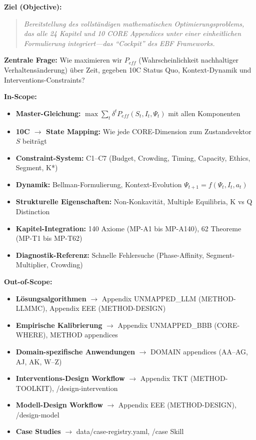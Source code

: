 \begin{tcolorbox}[colback=orange!5!white, colframe=orange!75!black,
    title=\textbf{Appendix Scope: Ziel / In-Scope / Out-of-Scope / Lieferobjekte}]

\textbf{Ziel (Objective):}
\begin{quote}
\textit{Bereitstellung des vollständigen mathematischen Optimierungsproblems, das alle 24 Kapitel
und 10 CORE Appendices unter einer einheitlichen Formulierung integriert---das ``Cockpit'' des EBF Frameworks.}
\end{quote}

\textbf{Zentrale Frage:} Wie maximieren wir $P_{eff}$ (Wahrscheinlichkeit nachhaltiger Verhaltensänderung)
über Zeit, gegeben 10C Status Quo, Kontext-Dynamik und Interventions-Constraints?

\vspace{0.5em}
\textbf{In-Scope:}
\begin{itemize}[nosep]
    \item \textbf{Master-Gleichung:} $\max \sum_t \delta^t P_{eff}(S_t, I_t, \Psi_t)$ mit allen Komponenten
    \item \textbf{10C $\to$ State Mapping:} Wie jede CORE-Dimension zum Zustandsvektor $S$ beiträgt
    \item \textbf{Constraint-System:} C1--C7 (Budget, Crowding, Timing, Capacity, Ethics, Segment, K*)
    \item \textbf{Dynamik:} Bellman-Formulierung, Kontext-Evolution $\Psi_{t+1} = f(\Psi_t, I_t, a_t)$
    \item \textbf{Strukturelle Eigenschaften:} Non-Konkavität, Multiple Equilibria, K vs Q Distinction
    \item \textbf{Kapitel-Integration:} 140 Axiome (MP-A1 bis MP-A140), 62 Theoreme (MP-T1 bis MP-T62)
    \item \textbf{Diagnostik-Referenz:} Schnelle Fehlersuche (Phase-Affinity, Segment-Multiplier, Crowding)
\end{itemize}

\vspace{0.5em}
\textbf{Out-of-Scope:}
\begin{itemize}[nosep]
    \item \textbf{Lösungsalgorithmen} $\rightarrow$ Appendix UNMAPPED_LLM (METHOD-LLMMC), Appendix EEE (METHOD-DESIGN)
    \item \textbf{Empirische Kalibrierung} $\rightarrow$ Appendix UNMAPPED_BBB (CORE-WHERE), METHOD appendices
    \item \textbf{Domain-spezifische Anwendungen} $\rightarrow$ DOMAIN appendices (AA--AG, AJ, AK, W--Z)
    \item \textbf{Interventions-Design Workflow} $\rightarrow$ Appendix TKT (METHOD-TOOLKIT), /design-intervention
    \item \textbf{Modell-Design Workflow} $\rightarrow$ Appendix EEE (METHOD-DESIGN), /design-model
    \item \textbf{Case Studies} $\rightarrow$ data/case-registry.yaml, /case Skill
\end{itemize}


\end{tcolorbox}
